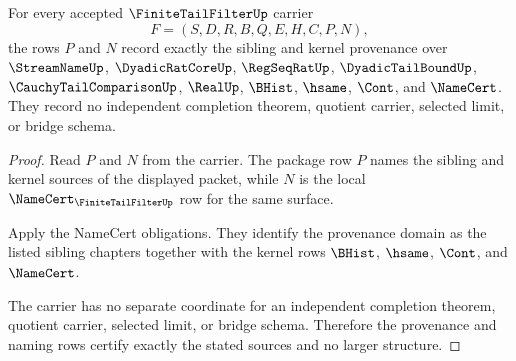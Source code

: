 \begin{theorem}
\label{thm:finite-tail-filter-structural-provenance-obligation}
For every accepted $\FiniteTailFilterUp$ carrier
$$
F=(S,D,R,B,Q,E,H,C,P,N),
$$
the rows $P$ and $N$ record exactly the sibling and kernel provenance over $\StreamNameUp$, $\DyadicRatCoreUp$, $\RegSeqRatUp$, $\DyadicTailBoundUp$, $\CauchyTailComparisonUp$, $\RealUp$, $\BHist$, $\hsame$, $\Cont$, and $\NameCert$. They record no independent completion theorem, quotient carrier, selected limit, or bridge schema.
\end{theorem}
\begin{proof}
Read $P$ and $N$ from the carrier. The package row $P$ names the sibling and kernel sources of the displayed packet, while $N$ is the local $\NameCert_{\FiniteTailFilterUp}$ row for the same surface.

Apply the NameCert obligations. They identify the provenance domain as the listed sibling chapters together with the kernel rows $\BHist$, $\hsame$, $\Cont$, and $\NameCert$.

The carrier has no separate coordinate for an independent completion theorem, quotient carrier, selected limit, or bridge schema. Therefore the provenance and naming rows certify exactly the stated sources and no larger structure.
\end{proof}

